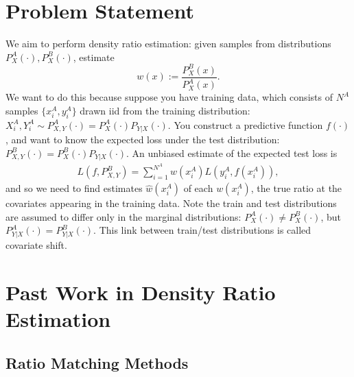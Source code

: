 \documentclass[8pt]{article}
\begin{document}
\section{Problem Statement}
We aim to perform density ratio estimation: given samples from distributions $P_X^A(\cdot),P_X^B(\cdot)$, estimate \[w(x) := \frac{P_X^B(x)}{P_X^A(x)}.\]  We want to do this because suppose you have training data, which consists of $N^A$ samples $\{x^A_i,y^A_i\}$ drawn iid from the training distribution: $X^A_i,Y^A_i \sim  P_{X,Y}^A(\cdot) = P_X^A(\cdot) P_{Y|X}(\cdot)$.  You construct a predictive function $f(\cdot)$, and want to know the expected loss under the test distribution: $P_{X,Y}^B(\cdot) = P_X^B(\cdot) P_{Y|X}(\cdot)$.  An unbiased estimate of the expected test loss is 
\begin{align}
L(f,P_{X,Y}^B) = \sum_{i=1}^{N^A} w(x^A_i) L(y_i^A,f(x^A_i)),\label{eq:weighted_loss}
\end{align}
and so we need to find estimates $\hat{w}(x^A_i)$ of each $w(x^A_i)$, the true ratio at the covariates appearing in the training data.  Note the train and test distributions are assumed to differ only in the marginal distributions: $P_X^A(\cdot) \neq P_X^B(\cdot)$, but $P_{Y|X}^A(\cdot) = P_{Y|X}^B(\cdot)$.  This link between train/test distributions is called covariate shift.
\section{Past Work in Density Ratio Estimation}
\subsection{Ratio Matching Methods}
\end{document}
